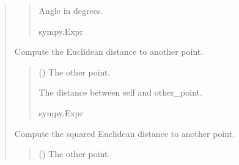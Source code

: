 \documentclass[letterpaper,10pt,english]{sphinxmanual}
\begin{document}
\begin{quote}
\begin{fulllineitems}
\begin{fulllineitems}
\begin{quote}
\begin{description}
\begin{itemize}
\end{itemize}

\sphinxAtStartPar
Angle in degrees.

\sphinxAtStartPar
sympy.Expr

\end{description}\end{quote}

\end{fulllineitems}


\begin{fulllineitems}
\label{\detokenize{pygeox:pygeox.basic_objects.Point.distance}}
\pysigstartsignatures
\pysiglinewithargsret
{}
{}
{}
\pysigstopsignatures
\sphinxAtStartPar
Compute the Euclidean distance to another point.
\begin{quote}\begin{description}
\sphinxAtStartPar
{} () \textendash{} The other point.

\sphinxAtStartPar
The distance between self and other\_point.

\sphinxAtStartPar
sympy.Expr

\end{description}\end{quote}

\end{fulllineitems}


\begin{fulllineitems}
\label{\detokenize{pygeox:pygeox.basic_objects.Point.distance_squared}}
\pysigstartsignatures
\pysiglinewithargsret
{}
{}
{}
\pysigstopsignatures
\sphinxAtStartPar
Compute the squared Euclidean distance to another point.
\begin{quote}\begin{description}
\sphinxAtStartPar
{} () \textendash{} The other point.


\end{description}
\end{quote}
\end{fulllineitems}
\end{fulllineitems}
\end{quote}
\end{document}
